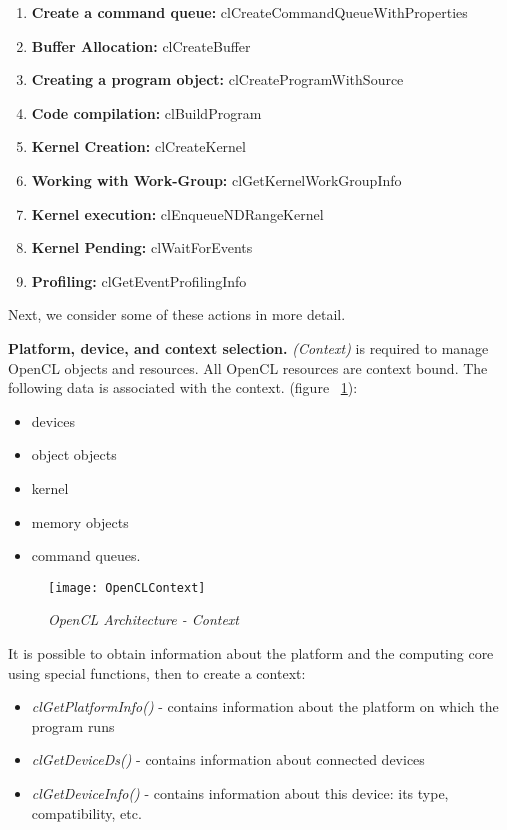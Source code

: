 {\begin{enumerate}
			\item\textbf{Create a command queue:} clCreateCommandQueueWithProperties
			\item\textbf{Buffer Allocation:} clCreateBuffer
			\item\textbf{Creating a program object:} clCreateProgramWithSource
			\item\textbf{Code compilation:} clBuildProgram
			\item\textbf{Kernel Creation:} clCreateKernel
			\item\textbf{Working with Work-Group:} clGetKernelWorkGroupInfo 
			\item\textbf{Kernel execution:} clEnqueueNDRangeKernel 
			\item\textbf{Kernel Pending:} clWaitForEvents 
			\item\textbf{Profiling:} clGetEventProfilingInfo
		\end{enumerate}
Next, we consider some of these actions in more detail.
	\par\textbf{Platform, device, and context selection.}  \textit{(Context)} is required to manage OpenCL objects and resources. All OpenCL resources are context bound. The following data is associated with the context. (figure ~\ref{OpenCLContext:image}):
		\begin{itemize}
		\item devices
		\item object objects
		\item kernel
		\item memory objects
		\item command queues.
		\end{itemize}
	\begin{figure}[H]
		\texttt{[image: OpenCLContext]}
		\caption{\textit{OpenCL Architecture - Context}}
		\label{OpenCLContext:image}
	\end{figure}
It is possible to obtain information about the platform and the computing core using special functions, then to create a context:
		\begin{itemize}
			\item\textit{clGetPlatformInfo()} - contains information about the platform on which the program runs
			\item\textit{clGetDeviceDs()} - contains information about connected devices
			\item\textit{clGetDeviceInfo()} - contains information about this device: its type, compatibility, etc.
		\end{itemize}
}
